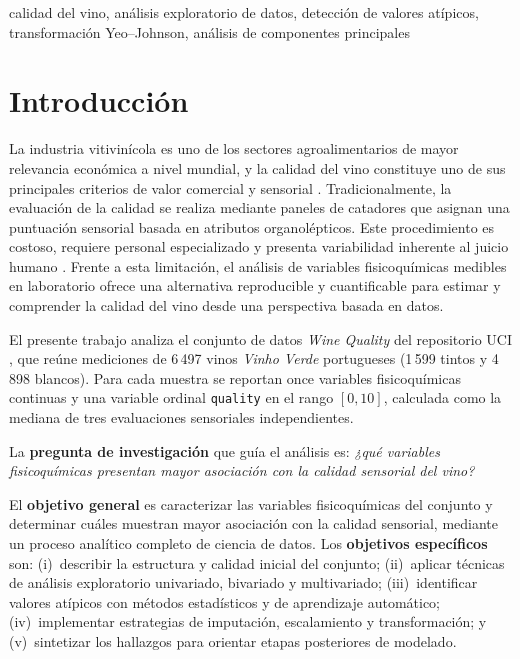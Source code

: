 \documentclass[conference]{IEEEtran}
\begin{document}
\begin{IEEEkeywords}
calidad del vino, análisis exploratorio de datos, detección de valores
atípicos, transformación Yeo--Johnson, análisis de componentes principales
\end{IEEEkeywords}

\section{Introducción}
\label{sec:introduccion}

La industria vitivinícola es uno de los sectores agroalimentarios de mayor
relevancia económica a nivel mundial, y la calidad del vino constituye uno de
sus principales criterios de valor comercial y sensorial \cite{cortez2009wine}.
Tradicionalmente, la evaluación de la calidad se realiza mediante paneles de
catadores que asignan una puntuación sensorial basada en atributos
organolépticos. Este procedimiento es costoso, requiere personal especializado
y presenta variabilidad inherente al juicio humano \cite{cortez2009wine}.
Frente a esta limitación, el análisis de variables fisicoquímicas medibles en
laboratorio ofrece una alternativa reproducible y cuantificable para estimar y
comprender la calidad del vino desde una perspectiva basada en datos.

El presente trabajo analiza el conjunto de datos \textit{Wine Quality} del
repositorio UCI \cite{uci_repo}, que reúne mediciones de 6\,497 vinos
\textit{Vinho Verde} portugueses (1\,599 tintos y 4\,898 blancos). Para cada
muestra se reportan once variables fisicoquímicas continuas y una variable
ordinal \texttt{quality} en el rango $[0, 10]$, calculada como la mediana de
tres evaluaciones sensoriales independientes.

La \textbf{pregunta de investigación} que guía el análisis es: \textit{¿qué
variables fisicoquímicas presentan mayor asociación con la calidad sensorial
del vino?}

El \textbf{objetivo general} es caracterizar las variables fisicoquímicas del
conjunto y determinar cuáles muestran mayor asociación con la calidad
sensorial, mediante un proceso analítico completo de ciencia de datos. Los
\textbf{objetivos específicos} son: (i)~describir la estructura y calidad
inicial del conjunto; (ii)~aplicar técnicas de análisis exploratorio
univariado, bivariado y multivariado; (iii)~identificar valores atípicos con
métodos estadísticos y de aprendizaje automático; (iv)~implementar estrategias
de imputación, escalamiento y transformación; y (v)~sintetizar los hallazgos
para orientar etapas posteriores de modelado.
\end{document}
